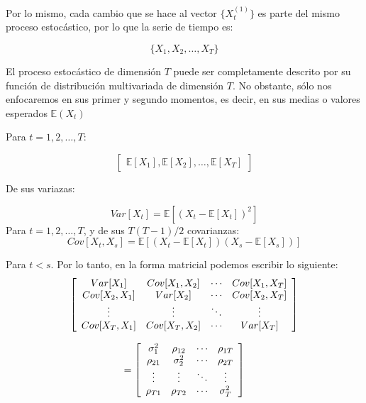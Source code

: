 \documentclass[
]{book}
\begin{document}
Por lo mismo, cada cambio que se hace al vector \(\{ X^{(1)}_t \}\) es
parte del mismo proceso estocástico, por lo que la serie de tiempo es:

\begin{equation}
    \{ X_1, X_2, \ldots, X_T \}
        \label{variast}
\end{equation}

El proceso estocástico de dimensión \(T\) puede ser completamente descrito
por su función de distribución multivariada de dimensión \(T\). No
obstante, sólo nos enfocaremos en sus primer y segundo momentos, es
decir, en sus medias o valores esperados \(\mathbb{E} (X_t)\)

Para \(t = 1, 2, \ldots, T\):

\begin{equation*}
\left[
    \begin{array}{c}
    \mathbb{E}[X_1], \mathbb{E}[X_2], \ldots, \mathbb{E}[X_T]
    \end{array}
\right]
\end{equation*}

De sus variazas:

\begin{equation*}
    Var[X_t] = \mathbb{E}[(X_t - \mathbb{E}[X_t])^2]
\end{equation*} Para \(t = 1, 2, \ldots, T\), y de sus \(T(T-1)/2\)
covarianzas: \begin{equation*}
    Cov[X_t,X_s] = \mathbb{E}[(X_t - \mathbb{E}[X_t])(X_s - \mathbb{E}[X_s])]
\end{equation*}

Para \(t < s\). Por lo tanto, en la forma matricial podemos escribir lo siguiente:
\begin{equation*}
\left[
    \begin{array}{c c c c}
    Var[X_1] & Cov[X_1,X_2] & \cdots & Cov[X_1,X_T] \\
    Cov[X_2,X_1] & Var[X_2] & \cdots & Cov[X_2,X_T] \\
    \vdots & \vdots & \ddots & \vdots \\
    Cov[X_T,X_1] & Cov[X_T,X_2] & \cdots & Var[X_T] \\
    \end{array}
\right]
\end{equation*}

\begin{equation}
= \left[
    \begin{array}{c c c c}
    \sigma_1^2 & \rho_{12} & \cdots & \rho_{1T} \\
    \rho_{21} & \sigma_2^2 & \cdots & \rho_{2T} \\
    \vdots & \vdots & \ddots & \vdots \\
    \rho_{T1} & \rho_{T2} & \cdots & \sigma_T^2 \\
    \end{array}
\right]
\label{eq:MATCOV}
\end{equation}
\end{document}
